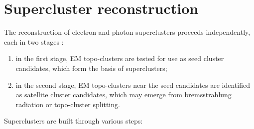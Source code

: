\documentclass[a4paper, oneside]{book}
\begin{document}
			
		\section{Supercluster reconstruction}
		The reconstruction of electron and photon superclusters proceeds independently, each in two stages \cite{El ph reco}:
		\begin{enumerate}
		\item in the first stage, EM topo-clusters are tested for use as seed cluster candidates, which form the basis of superclusters; 
		\item in the second stage, EM topo-clusters near the seed candidates are identified as satellite cluster candidates, which may emerge from bremsstrahlung radiation or topo-cluster splitting.
		\end{enumerate}
		Superclusters are built through various steps:
\end{document}
